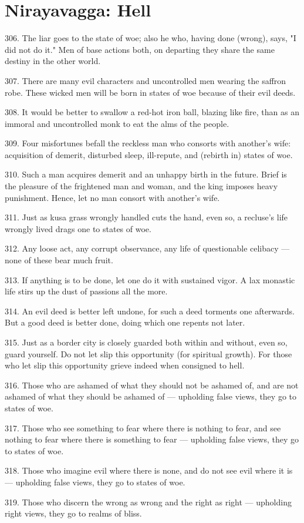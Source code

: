 \newpage
\chapter{Nirayavagga: Hell}
306. The liar goes to the state of woe; also he who, having done (wrong), says, "I did not do it." Men of base actions both, on departing they share the same destiny in the other world.

307. There are many evil characters and uncontrolled men wearing the saffron robe. These wicked men will be born in states of woe because of their evil deeds.

308. It would be better to swallow a red-hot iron ball, blazing like fire, than as an immoral and uncontrolled monk to eat the alms of the people.

309. Four misfortunes befall the reckless man who consorts with another's wife: acquisition of demerit, disturbed sleep, ill-repute, and (rebirth in) states of woe.

310. Such a man acquires demerit and an unhappy birth in the future. Brief is the pleasure of the frightened man and woman, and the king imposes heavy punishment. Hence, let no man consort with another's wife.

311. Just as kusa grass wrongly handled cuts the hand, even so, a recluse's life wrongly lived drags one to states of woe.

312. Any loose act, any corrupt observance, any life of questionable celibacy — none of these bear much fruit.

313. If anything is to be done, let one do it with sustained vigor. A lax monastic life stirs up the dust of passions all the more.

314. An evil deed is better left undone, for such a deed torments one afterwards. But a good deed is better done, doing which one repents not later.

315. Just as a border city is closely guarded both within and without, even so, guard yourself. Do not let slip this opportunity (for spiritual growth). For those who let slip this opportunity grieve indeed when consigned to hell.

316. Those who are ashamed of what they should not be ashamed of, and are not ashamed of what they should be ashamed of — upholding false views, they go to states of woe.

317. Those who see something to fear where there is nothing to fear, and see nothing to fear where there is something to fear — upholding false views, they go to states of woe.

318. Those who imagine evil where there is none, and do not see evil where it is — upholding false views, they go to states of woe.

319. Those who discern the wrong as wrong and the right as right — upholding right views, they go to realms of bliss.
